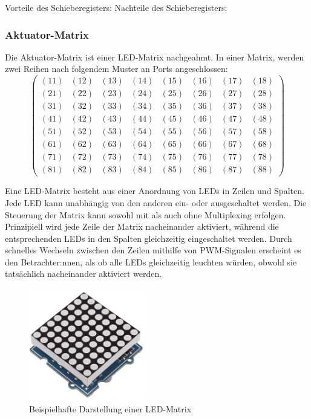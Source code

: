 Vorteile des Schieberegisters:\newline
Nachteile des Schieberegisters:

\subsubsection{Aktuator-Matrix}
Die Aktuator-Matrix ist einer LED-Matrix nachgeahmt.
In einer Matrix, werden zwei Reihen nach folgendem Muster an Ports angeschlossen:
$$
\begin{pmatrix}
	(11) & (12) & (13) & (14) & (15) & (16) & (17) & (18) \\
	(21) & (22) & (23) & (24) & (25) & (26) & (27) & (28) \\
	(31) & (32) & (33) & (34) & (35) & (36) & (37) & (38) \\
	(41) & (42) & (43) & (44) & (45) & (46) & (47) & (48) \\
	(51) & (52) & (53) & (54) & (55) & (56) & (57) & (58) \\
	(61) & (62) & (63) & (64) & (65) & (66) & (67) & (68) \\
	(71) & (72) & (73) & (74) & (75) & (76) & (77) & (78) \\
	(81) & (82) & (83) & (84) & (85) & (86) & (87) & (88)
\end{pmatrix}
$$

Eine LED-Matrix besteht aus einer Anordnung von LEDs in Zeilen und Spalten.
Jede LED kann unabhängig von den anderen ein- oder ausgeschaltet werden.
Die Steuerung der Matrix kann sowohl mit als auch ohne Multiplexing erfolgen.
Prinzipiell wird jede Zeile der Matrix nacheinander aktiviert, während die
entsprechenden LEDs in den Spalten gleichzeitig eingeschaltet werden.
Durch schnelles Wechseln zwischen den Zeilen mithilfe von \ac{PWM}-Signalen erscheint es den Betrachter:nnen, als ob alle LEDs
gleichzeitig leuchten würden, obwohl sie tatsächlich nacheinander aktiviert werden.\newline

\begin{figure}[htbp]
	\centering
	\includegraphics[width=0.45\textwidth]{img/LED-Matrix}
	\caption{Beispielhafte Darstellung einer LED-Matrix}
	\label{img:LED-Matrix}
\end{figure}

